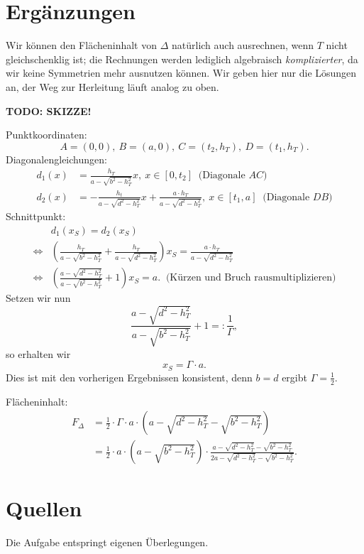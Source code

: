 \documentclass[]{scrartcl}
\begin{document}
\section*{Ergänzungen}
Wir können den Flächeninhalt von $\Delta$ natürlich auch ausrechnen,
wenn $T$ nicht gleichschenklig ist; die Rechnungen werden lediglich
algebraisch \textit{komplizierter}, da wir keine Symmetrien mehr
ausnutzen können. Wir geben hier nur die Lösungen an, der Weg zur 
Herleitung läuft analog zu oben.

\noindent 
\textbf{TODO: SKIZZE!}

\noindent 
Punktkoordinaten:
$$
A = (0,0), ~ B = (a,0), ~ C = (t_2,h_T), ~ D = (t_1,h_T). 
$$
Diagonalengleichungen:
\begin{align*}
	d_1(x) &= \frac{h_T}{a-\sqrt{b^2-h_T^2}}x, ~ x \in [0,t_2] ~
	\text{ (Diagonale $AC$)}
	\\
	d_2(x) &= -\frac{h_t}{a-\sqrt{d^2-h_T^2}}x + \frac{a\cdot h_T}
	{a-\sqrt{d^2-h_T^2}}, ~ x \in [t_1,a] ~ \text{ (Diagonale $DB$)}
\end{align*}
Schnittpunkt:
\begin{align*}
	& d_1(x_S) = d_2(x_S)
	\\
	\Leftrightarrow & 
	\left ( 
		\frac{h_T}{a-\sqrt{b^2-h_T^2}} + 
		\frac{h_T}{a-\sqrt{d^2-h_T^2}}
	\right ) 
	x_S = \frac{a\cdot h_T}{a-\sqrt{d^2-h_T^2}}
	\\
	\Leftrightarrow & 
	\left ( 
		\frac{a-\sqrt{d^2-h_T^2}}{a-\sqrt{b^2-h_T^2}} + 1
	\right )
	x_S = a. ~ \text{ (Kürzen und Bruch rausmultiplizieren)}
\end{align*}
Setzen wir nun 
$$
	\frac{a-\sqrt{d^2-h_T^2}}{a-\sqrt{b^2-h_T^2}} + 1 =: \frac{1}{\Gamma},
$$
so erhalten wir 
$$
x_S = \Gamma \cdot a.
$$
Dies ist mit den vorherigen Ergebnissen konsistent, denn $b=d$ 
ergibt $\Gamma = \frac{1}{2}$. 

\noindent 
Flächeninhalt:
\begin{align*}
	F_\Delta 
	&=
	\frac{1}{2} \cdot \Gamma \cdot a \cdot 
	\left ( 
	a - \sqrt{d^2-h_T^2} - \sqrt{b^2-h_T^2}
	\right )
	\\ &=
	\frac{1}{2} \cdot a \cdot 
	\left (
		a-\sqrt{b^2-h_T^2}
	\right )
	\cdot 
	\frac
	{
		a - \sqrt{d^2-h_T^2} - \sqrt{b^2-h_T^2}
	}
	{
		2a - \sqrt{d^2-h_T^2} - \sqrt{b^2-h_T^2}
	}.
\end{align*}


\section*{Quellen}
Die Aufgabe entspringt eigenen Überlegungen.
\end{document}
